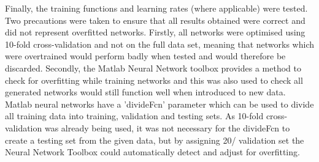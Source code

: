 \documentclass[a4paper]{article}
\begin{document}
Finally, the training functions and learning rates (where applicable) were tested.\\  

Two precautions were taken to ensure that all results obtained were correct and did not represent overfitted networks. Firstly, all networks were
optimised using 10-fold cross-validation and not on the full data set, meaning that networks which were overtrained would perform badly when tested
and would therefore be discarded. Secondly, the Matlab Neural Network toolbox provides a method to check for overfitting while training networks and
this was also used to check all generated networks would still function well when introduced to new data. Matlab neural networks have a 'divideFcn'
parameter which can be used to divide all training data into training, validation and testing sets. As 10-fold cross-validation was already being
used, it was not necessary for the divideFcn to create a testing set from the given data, but by assigning 20/%
validation set the Neural Network Toolbox could automatically detect and adjust for overfitting.\\ 








\end{document}
